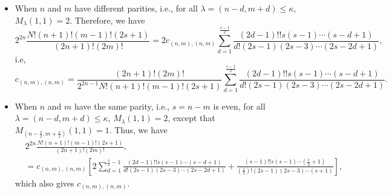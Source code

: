\documentclass[10pt,oneside,american]{amsart}
\numberwithin{equation}{section}
\numberwithin{figure}{section}
\theoremstyle{definition}
\theoremstyle{remark}
\theoremstyle{plain}
\theoremstyle{definition}
\theoremstyle{plain}
\theoremstyle{plain}
\theoremstyle{plain}
\begin{document}
\begin{itemize}
\item When $n$ and $m$ have different parities, i.e., for all $\lambda=\left(n-d,m+d\right)\leq\kappa$,
$M_{\lambda}\left(1,1\right)=2$. Therefore, we have 
\[
2^{2n}\frac{N!\left(n+1\right)!\left(m-1\right)!\left(2s+1\right)}{\left(2n+1\right)!\left(2m\right)!}=2c_{\left(n,m\right),\left(n,m\right)}\sum_{d=1}^{\frac{s-1}{2}}\frac{\left(2d-1\right)!!s\left(s-1\right)\cdots\left(s-d+1\right)}{d!\left(2s-1\right)\left(2s-3\right)\cdots\left(2s-2d+1\right)},
\]
i.e, 
\[
c_{\left(n,m\right),\left(n,m\right)}=\frac{\left(2n+1\right)!\left(2m\right)!}{2^{2n-1}N!\left(n+1\right)!\left(m-1\right)!\left(2s+1\right)}\sum_{d=1}^{\frac{s-1}{2}}\frac{\left(2d-1\right)!!s\left(s-1\right)\cdots\left(s-d+1\right)}{d!\left(2s-1\right)\left(2s-3\right)\cdots\left(2s-2d+1\right)}.
\]
\item When $n$ and $m$ have the same parity, i.e., $s=n-m$ is even, for
all $\lambda=\left(n-d,m+d\right)\leq\kappa$, $M_{\lambda}\left(1,1\right)=2$,
except that $M_{\left(n-\frac{s}{2},m+\frac{s}{2}\right)}\left(1,1\right)=1$.
Thus, we have 
\begin{align*}
 & 2^{2n}\frac{N!\left(n+1\right)!\left(m-1\right)!\left(2s+1\right)}{\left(2n+1\right)!\left(2m\right)!},\\
 & =c_{\left(n,m\right),\left(n,m\right)}\left[2\sum_{d=1}^{\frac{s}{2}-1}\frac{\left(2d-1\right)!!s\left(s-1\right)\cdots\left(s-d+1\right)}{d!\left(2s-1\right)\left(2s-3\right)\cdots\left(2s-2d+1\right)}+\frac{\left(s-1\right)!!s\left(s-1\right)\cdots\left(\frac{s}{2}+1\right)}{\left(\frac{s}{2}\right)!\left(2s-1\right)\left(2s-3\right)\cdots\left(s+1\right)}\right],
\end{align*}
which also gives $c_{(n,m),(n,m)}$. 
\end{itemize}
\end{document}
